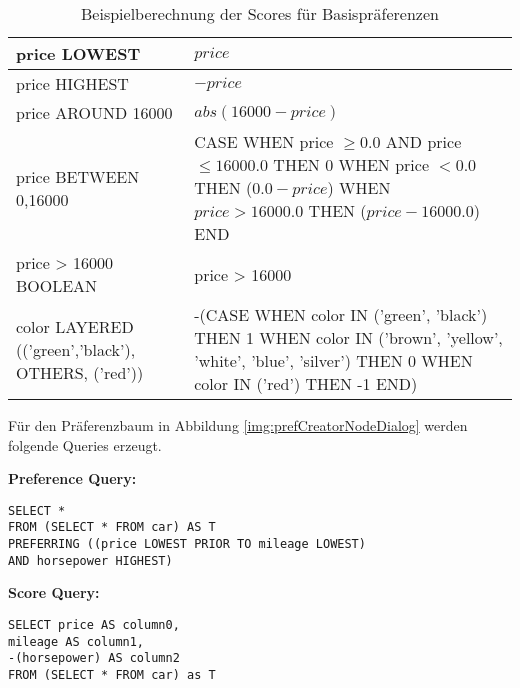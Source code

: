 \begin{table}[H]
  \centering
  \begin{tabular}{|M{4cm}|M{10cm}|}
    \hline
    price LOWEST &  $price$ \\ \hline
    price HIGHEST & $-price$ \\ \hline
    price AROUND 16000 & $abs(16000-price)$ \\ \hline
    price BETWEEN 0,16000 & CASE WHEN price $\geq 0.0$ AND price $\leq 16000.0$ THEN $0$ WHEN price $< 0.0$ THEN ($0.0 - price$) WHEN $price > 16000.0$ THEN ($price-16000.0$) END \\ \hline
    price > 16000 BOOLEAN & price > 16000 \\ \hline
    color LAYERED (('green','black'), OTHERS, ('red')) & -(CASE WHEN color IN ('green', 'black') THEN 1 WHEN color IN ('brown', 'yellow', 'white', 'blue', 'silver') THEN 0 WHEN color IN ('red') THEN -1 END) \\ \hline
  \end{tabular}
  \newline\newline
  \caption{Beispielberechnung der Scores für Basispräferenzen}\label{tbl:scoreComputation}
\end{table}

Für den Präferenzbaum in Abbildung \ref{img:prefCreatorNodeDialog} werden folgende Queries erzeugt.

\textbf{Preference Query:}
\begin{verbatim}
SELECT * 
FROM (SELECT * FROM car) AS T 
PREFERRING ((price LOWEST PRIOR TO mileage LOWEST) 
AND horsepower HIGHEST)
\end{verbatim}

\textbf{Score Query:}
\begin{verbatim}
SELECT price AS column0,
mileage AS column1,
-(horsepower) AS column2 
FROM (SELECT * FROM car) as T
\end{verbatim}

